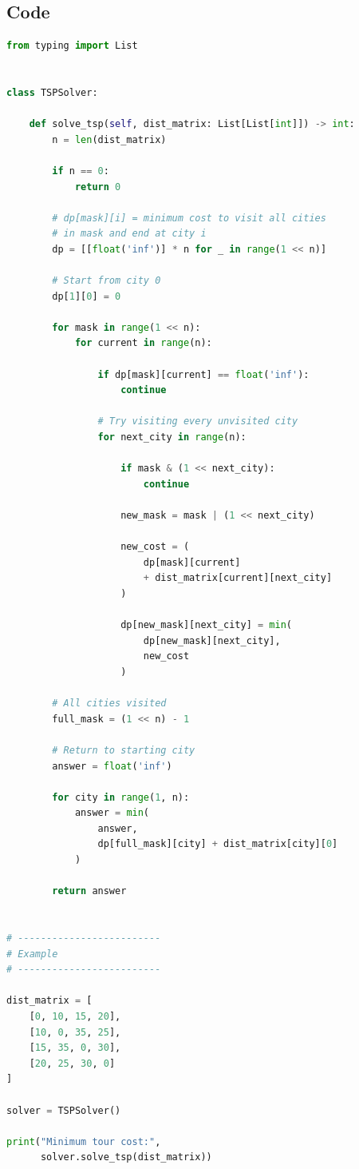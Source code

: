 

\subsection*{Code}


\begin{lstlisting}[language=python]
from typing import List


class TSPSolver:

    def solve_tsp(self, dist_matrix: List[List[int]]) -> int:
        n = len(dist_matrix)

        if n == 0:
            return 0

        # dp[mask][i] = minimum cost to visit all cities
        # in mask and end at city i
        dp = [[float('inf')] * n for _ in range(1 << n)]

        # Start from city 0
        dp[1][0] = 0

        for mask in range(1 << n):
            for current in range(n):

                if dp[mask][current] == float('inf'):
                    continue

                # Try visiting every unvisited city
                for next_city in range(n):

                    if mask & (1 << next_city):
                        continue

                    new_mask = mask | (1 << next_city)

                    new_cost = (
                        dp[mask][current]
                        + dist_matrix[current][next_city]
                    )

                    dp[new_mask][next_city] = min(
                        dp[new_mask][next_city],
                        new_cost
                    )

        # All cities visited
        full_mask = (1 << n) - 1

        # Return to starting city
        answer = float('inf')

        for city in range(1, n):
            answer = min(
                answer,
                dp[full_mask][city] + dist_matrix[city][0]
            )

        return answer


# -------------------------
# Example
# -------------------------

dist_matrix = [
    [0, 10, 15, 20],
    [10, 0, 35, 25],
    [15, 35, 0, 30],
    [20, 25, 30, 0]
]

solver = TSPSolver()

print("Minimum tour cost:",
      solver.solve_tsp(dist_matrix))
\end{lstlisting}

